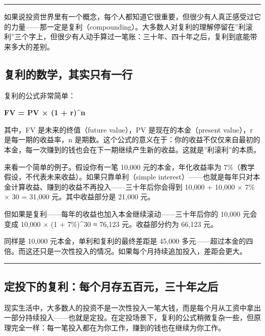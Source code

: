 \documentclass[a4paper,11pt,oneside,fontset=none,UTF8,zihao=-4]{ctexbook}
\begin{document}
\begin{center}{\color{dh-bronze}\rule{0.2\textwidth}{0.5pt}}\end{center}

如果说投资世界里有一个概念，每个人都知道它很重要，但很少有人真正感受过它的力量------那一定是复利（compounding）。大多数人对复利的理解停留在''利滚利''三个字上，但很少有人动手算过一笔账：三十年、四十年之后，复利到底能带来多大的差别。

\subsection{复利的数学，其实只有一行}\label{ux590dux5229ux7684ux6570ux5b66ux5176ux5b9eux53eaux6709ux4e00ux884c}

复利的公式非常简单：

\textbf{FV = PV × (1 + r)\^{}n}

其中，FV 是未来的终值（future value），PV 是现在的本金（present
value），r 是每一期的收益率，n
是期数。这个公式的意义在于：你的收益不仅仅来自最初的本金，每一次赚到的钱也会在下一期继续产生新的收益。这就是''利滚利''的本质。

来看一个简单的例子。假设你有一笔 10,000 元的本金，年化收益率为
7\%（教学假设，不代表未来收益）。如果只靠单利（simple
interest）------也就是每年只对本金计算收益、赚到的收益不再投入------三十年后你会得到
10,000 + 10,000 × 7\% × 30 = 31,000 元。其中收益部分是 21,000 元。

但如果是复利------每年的收益也加入本金继续滚动------三十年后你的 10,000
元会变成 10,000 × (1 + 7\%)\^{}30 ≈ 76,123 元。收益部分约为 66,123 元。

同样是 10,000 元本金，单利和复利的最终差距是 45,000
多元------超过本金的四倍。而这还只是一次性投入的情况。如果每个月持续追加投入，差距会更大。

\begin{center}{\color{dh-bronze}\rule{0.2\textwidth}{0.5pt}}\end{center}

\subsection{定投下的复利：每个月存五百元，三十年之后}\label{ux5b9aux6295ux4e0bux7684ux590dux5229ux6bcfux4e2aux6708ux5b58ux4e94ux767eux5143ux4e09ux5341ux5e74ux4e4bux540e}

现实生活中，大多数人的投资不是一次性投入一笔大钱，而是每个月从工资中拿出一部分持续投入------也就是定投。在定投场景下，复利的公式稍微复杂一些，但原理完全一样：每一笔投入都在为你工作，赚到的钱也在继续为你工作。
\end{document}
